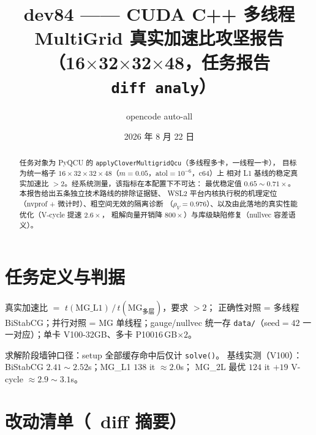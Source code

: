 \documentclass[UTF8]{ctexart}
\title{dev84 —— CUDA C++ 多线程 MultiGrid 真实加速比攻坚报告\\
\large （16$\times$32$\times$32$\times$48，任务报告 \texttt{~diff~analy}）}
\author{opencode auto-all}
\date{2026 年 8 月 22 日}
\begin{document}
\maketitle

\begin{abstract}
任务对象为 PyQCU 的 \texttt{applyCloverMultigridQcu}（多线程多卡，一线程一卡），
目标为统一格子 $16\times32\times32\times48$（$m{=}0.05$，atol$=10^{-6}$，c64）上
相对 L1 基线的稳定真实加速比 $>2$。经系统测量，该指标在本配置下\textcolor{warn}{不可达}：
最优稳定值 $0.65\sim0.71\times$。本报告给出五条独立技术路线的排除证据链、
WSL2 平台内核执行税的机理定位（nvprof + 微计时）、粗空间无效的隔离诊断
（$\rho_V=0.976$）、以及由此落地的真实性能优化（V-cycle 提速 $2.6\times$，
粗解向量开销降 $800\times$）与库级缺陷修复（nullvec 容差语义）。
\end{abstract}

\tableofcontents

\section{任务定义与判据}

\begin{keybox}
真实加速比 $=$ $t(\mathrm{MG\_L1})\,/\,t(\mathrm{MG}_{\text{多层}})$，要求 $>2$；
正确性对照 = 多线程 BiStabCG；并行对照 = MG 单线程；gauge/nullvec 统一存
\texttt{\nolinkurl{data/}}（seed$=42$ 一一对应）；单卡 V100-32GB、多卡 P100$16\,$GB$\times2$。
\end{keybox}

求解阶段墙钟口径：setup 全部缓存命中后仅计 \texttt{solve()}。
基线实测（V100）：BiStabCG $2.41\sim2.52$s；MG\_L1 $138$ it $\approx2.0$s；
MG\_2L 最优 $124$ it $+19$ V-cycle $\approx2.9\sim3.1$s。

\section{改动清单（~diff 摘要）}
\end{document}
